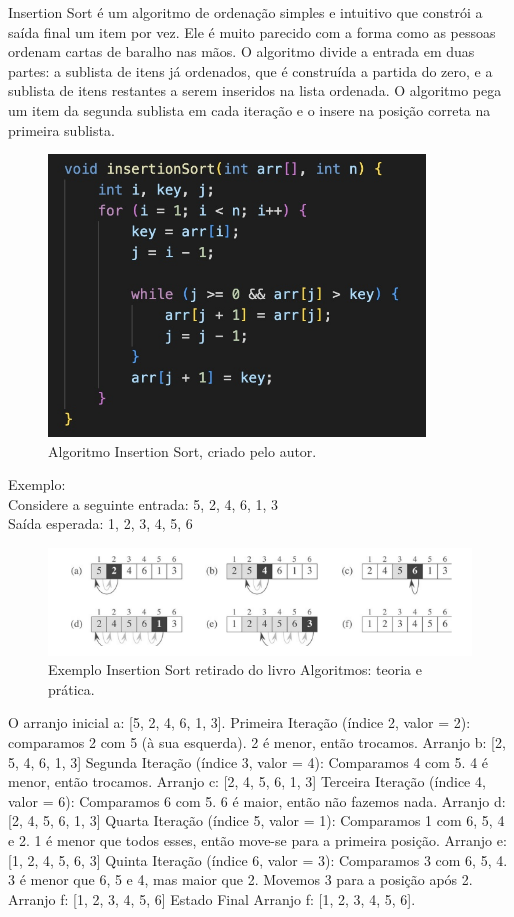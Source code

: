 Insertion Sort é um algoritmo de ordenação simples e intuitivo que constrói a saída final um item por vez. Ele é muito parecido com a forma como as pessoas ordenam cartas de baralho nas mãos. O algoritmo divide a entrada em duas partes: a sublista de itens já ordenados, que é construída a partida do zero, e a sublista de itens restantes a serem inseridos na lista ordenada. O algoritmo pega um item da segunda sublista em cada iteração e o insere na posição correta na primeira sublista.

\begin{figure}[htbp]
    \centering
    \includegraphics[width = 10cm]{Imagens/Insertion Sort/Imageminsert.jpg}
    \caption{Algoritmo Insertion Sort, criado pelo autor. }
    \label{fig:imagem_insert}
\end{figure}

\newpage
 Exemplo:\\
 Considere a seguinte entrada: 5, 2, 4, 6, 1, 3\\
 Saída esperada: 1, 2, 3, 4, 5, 6
\begin{figure}[htbp]
    \centering
    \includegraphics[width = 16cm]{Imagens/Insertion Sort/imagem1.png}
    \caption{Exemplo Insertion Sort retirado do livro Algoritmos: teoria e prática. }
    \label{grafico_insert}
\end{figure}

\cite{cormen2002}

O arranjo inicial a: [5, 2, 4, 6, 1, 3].
Primeira Iteração (índice 2, valor = 2):
comparamos 2 com 5 (à sua esquerda).
2 é menor, então trocamos.
Arranjo b: [2, 5, 4, 6, 1, 3]
Segunda Iteração (índice 3, valor = 4):
Comparamos 4 com 5.
4 é menor, então trocamos.
Arranjo c: [2, 4, 5, 6, 1, 3]
Terceira Iteração (índice 4, valor = 6):
Comparamos 6 com 5.
6 é maior, então não fazemos nada.
Arranjo d: [2, 4, 5, 6, 1, 3]
Quarta Iteração (índice 5, valor = 1):
Comparamos 1 com 6, 5, 4 e 2.
1 é menor que todos esses, então move-se para a primeira posição.
Arranjo e: [1, 2, 4, 5, 6, 3]
Quinta Iteração (índice 6, valor = 3):
Comparamos 3 com 6, 5, 4.
3 é menor que 6, 5 e 4, mas maior que 2.
Movemos 3 para a posição após 2.
Arranjo f: [1, 2, 3, 4, 5, 6]
Estado Final
Arranjo f: [1, 2, 3, 4, 5, 6].
